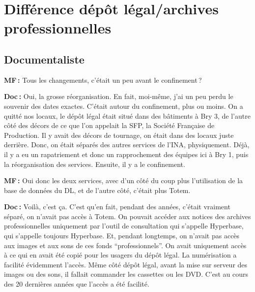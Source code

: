 \section*{Différence dépôt légal/archives professionnelles }

\subsection*{Documentaliste}  

\textbf{MF :} Tous les changements, c'était un peu avant le confinement ? 

\textbf{Doc :} Oui, la grosse réorganisation. En fait, moi-même, j'ai un peu perdu le souvenir des dates exactes.  C’était autour du confinement, plus ou moins. On a quitté nos locaux, le dépôt légal était situé dans des bâtiments à Bry 3, de l'autre côté des décors de ce que l'on appelait la SFP, la Société Française de Production. Il y avait des décors de tournage, on était dans des locaux juste derrière. Donc, on était séparés des autres services de l’INA, physiquement. Déjà, il y a eu un rapatriement et donc un rapprochement des équipes ici à Bry 1, puis la réorganisation des services. Ensuite, il y a le confinement.

\textbf{MF :} Oui donc les deux services, avec d'un côté du coup plus l'utilisation de la base de données du DL, et de l'autre côté, c'était plus Totem. 

\textbf{Doc :} Voilà, c'est ça. C'est qu'en fait, pendant des années, c'était vraiment séparé, on n'avait pas accès à Totem.  On pouvait accéder aux notices des archives professionnelles uniquement par l'outil de consultation qui s'appelle Hyperbase, qui s'appelle toujours Hyperbase. Et, pendant longtemps, on n'avait pas accès aux images et aux sons de ces fonds “professionnels”. On avait uniquement accès à ce qui en avait été copié pour les usagers du dépôt légal. La numérisation a facilité évidemment l’accès. Même côté dépôt légal, avant la mise sur serveur des images ou des sons, il fallait commander les cassettes ou les DVD. C'est au cours des 20 dernières années que l'accès a été facilité.\\